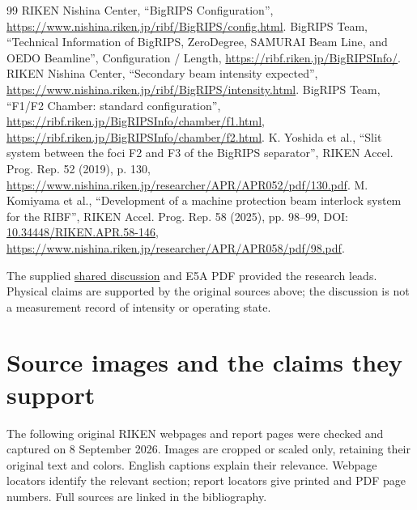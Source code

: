 \documentclass[11pt,a4paper]{article}
\begin{document}
\begin{thebibliography}{99}
 RIKEN Nishina Center, ``BigRIPS Configuration'',\newline
\url{https://www.nishina.riken.jp/ribf/BigRIPS/config.html}.
 BigRIPS Team, ``Technical Information of BigRIPS, ZeroDegree, SAMURAI Beam Line, and OEDO Beamline'', Configuration / Length,\newline
\url{https://ribf.riken.jp/BigRIPSInfo/}.
 RIKEN Nishina Center, ``Secondary beam intensity expected'',\newline
\url{https://www.nishina.riken.jp/ribf/BigRIPS/intensity.html}.
 BigRIPS Team, ``F1/F2 Chamber: standard configuration'',\newline
\url{https://ribf.riken.jp/BigRIPSInfo/chamber/f1.html},\newline
\url{https://ribf.riken.jp/BigRIPSInfo/chamber/f2.html}.
 K. Yoshida et al., ``Slit system between the foci F2 and F3 of the BigRIPS separator'', RIKEN Accel. Prog. Rep. 52 (2019), p. 130,\newline
\url{https://www.nishina.riken.jp/researcher/APR/APR052/pdf/130.pdf}.
 M. Komiyama et al., ``Development of a machine protection beam interlock system for the RIBF'', RIKEN Accel. Prog. Rep. 58 (2025), pp. 98--99,\newline
DOI: \href{https://doi.org/10.34448/RIKEN.APR.58-146}{10.34448/RIKEN.APR.58-146},\newline
\url{https://www.nishina.riken.jp/researcher/APR/APR058/pdf/98.pdf}.
\end{thebibliography}

The supplied \href{https://chatgpt.com/share/6a9fa6fc-7c6c-83ee-949f-a9614eb676f1}{shared discussion} and E5A PDF provided the research leads. Physical claims are supported by the original sources above; the discussion is not a measurement record of intensity or operating state.

\clearpage
\section{Source images and the claims they support}
The following original RIKEN webpages and report pages were checked and captured on 8 September 2026. Images are cropped or scaled only, retaining their original text and colors. English captions explain their relevance. Webpage locators identify the relevant section; report locators give printed and PDF page numbers. Full sources are linked in the bibliography.
\end{document}
